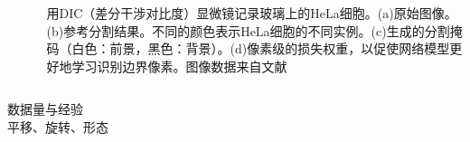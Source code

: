 \documentclass{beamer}%
\begin{document}
\begin{frame}
\begin{columns}
\begin{column}{0.6\linewidth}
\begin{figure}
                \label{fig:fastdata}
            \end{figure}

        \end{column}

        \begin{column}{0.4\linewidth}
            \footnotesize
            用DIC（差分干涉对比度）显微镜记录玻璃上的HeLa细胞。(a)原始图像。(b)参考分割结果。不同的颜色表示HeLa细胞的不同实例。(c)生成的分割掩码（白色：前景，黑色：背景）。(d)像素级的损失权重，以促使网络模型更好地学习识别边界像素。图像数据来自文献\citet{Unet2015Olaf}
        \end{column}
    \end{columns}

    \vspace{0.2cm}

    数据量与经验\\
    平移、旋转、形态


\end{frame}
\end{document}
